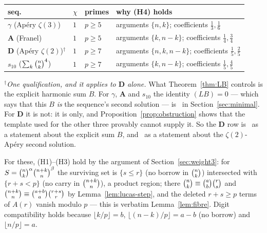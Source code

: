 \begin{center}\small
\begin{tabular}{@{}llll@{}}
\toprule
seq. & $\chi$ & primes & why (H4) holds\\
\midrule
$\gamma$ (Ap\'ery $\zeta(3)$) & $1$ & $p\ge5$ & arguments $\{n,k\}$; coefficients $\frac13,\frac16$\\
$\mathbf A$ (Franel) & $1$ & $p\ge5$ & arguments $\{k,n-k\}$; coefficients $\frac14,\frac34$\\
$\mathbf D$ (Ap\'ery $\zeta(2)$)$^{\dagger}$ & $1$ & $p\ge7$ & arguments $\{n,k,n-k\}$; coefficients $\frac15,\frac25$\\
$s_{10}$ ($\sum_k\binom{n}{k}^4$) & $1$ & $p\ge7$ & arguments $\{k,n-k\}$; coefficients $\frac15,\frac45$\\
\bottomrule
\end{tabular}
\end{center}

\noindent
$^{\dagger}$\emph{One qualification, and it applies to $\mathbf D$ alone.} What
Theorem~\ref{thm:LB} controls is the explicit harmonic sum $B$. For $\gamma$, $\mathbf A$ and
$s_{10}$ the identity $(LB)=0$ --- which says that this $B$ \emph{is} the sequence's second
solution --- is \Proved\ in Section~\ref{sec:minimal}. For $\mathbf D$ it is not: it is
 only, and Proposition~\ref{prop:obstruction} shows that the template used
for the other three provably cannot supply it. So the $\mathbf D$ row is \Proved\ as a statement
about the explicit sum $B$, and \Verified\ as a statement about the $\zeta(2)$-Ap\'ery second
solution.

\noindent
For these, (H1)--(H3) hold by the argument of Section~\ref{sec:weight3}: for
$S=\binom{n}{k}^{\alpha}\binom{n+k}{n}^{\beta}$ the surviving set is $\{s\le r\}$ (no borrow in
$\binom{n}{k}$) intersected with $\{r+s<p\}$ (no carry in $\binom{n+k}{n}$), a product region;
there $\binom{n}{k}\equiv\binom{a}{b}\binom{r}{s}$ and $\binom{n+k}{n}\equiv\binom{a+b}{a}\binom{r+s}{r}$ by
Lemma~\ref{lem:lucas-step}, and the deleted $r+s\ge p$ terms of $A(r)$ vanish modulo $p$
--- this is verbatim Lemma~\ref{lem:fibre}. Digit compatibility holds because
$\lfloor k/p\rfloor=b$, $\lfloor(n-k)/p\rfloor=a-b$ (no borrow) and
$\lfloor n/p\rfloor=a$.

